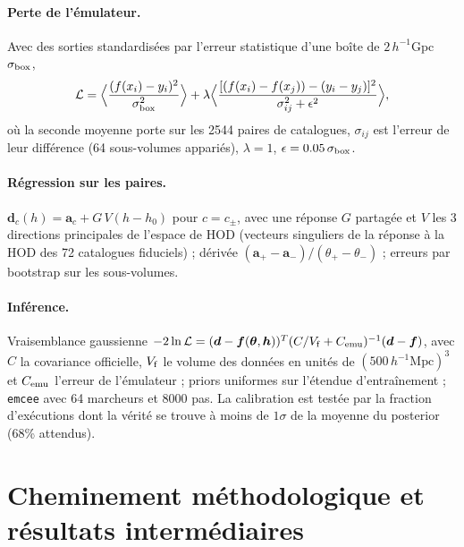 \documentclass[11pt,twocolumn]{article}
\newcommand{\Mpch}{\,h^{-1}\mathrm{Mpc}}
\begin{document}
\paragraph{Perte de l'émulateur.} Avec des sorties standardisées par l'erreur statistique d'une boîte de $2\,h^{-1}$Gpc $\sigma_{\rm box}$,
\begin{equation}
\mathcal L = \Big\langle \frac{(f(x_i) - y_i)^2}{\sigma_{\rm box}^2}\Big\rangle + \lambda \Big\langle \frac{[(f(x_i) - f(x_j)) - (y_i - y_j)]^2}{\sigma_{ij}^2 + \epsilon^2}\Big\rangle,
\end{equation}
où la seconde moyenne porte sur les 2544 paires de catalogues, $\sigma_{ij}$ est l'erreur de leur différence (64 sous-volumes appariés), $\lambda=1$, $\epsilon=0.05\,\sigma_{\rm box}$.

\paragraph{Régression sur les paires.} $\boldsymbol d_c(h) = \boldsymbol a_c + G\,V(h-h_0)$ pour $c=c_\pm$, avec une réponse $G$ partagée et $V$ les 3 directions principales de l'espace de HOD (vecteurs singuliers de la réponse à la HOD des 72 catalogues fiduciels) ; dérivée $(\boldsymbol a_+-\boldsymbol a_-)/(\theta_+-\theta_-)$ ; erreurs par bootstrap sur les sous-volumes.

\paragraph{Inférence.} Vraisemblance gaussienne $-2\ln\mathcal L = (\boldsymbol d - \boldsymbol f(\boldsymbol\theta,\boldsymbol h))^T (C/V_{\rm f} + C_{\rm emu})^{-1}(\boldsymbol d - \boldsymbol f)$, avec $C$ la covariance officielle, $V_{\rm f}$ le volume des données en unités de $(500\Mpch)^3$ et $C_{\rm emu}$ l'erreur de l'émulateur ; priors uniformes sur l'étendue d'entraînement ; \texttt{emcee} avec 64 marcheurs et 8000 pas. La calibration est testée par la fraction d'exécutions dont la vérité se trouve à moins de $1\sigma$ de la moyenne du posterior (68\% attendus).

\section{Cheminement méthodologique et résultats intermédiaires}
\label{app:path}
\end{document}
